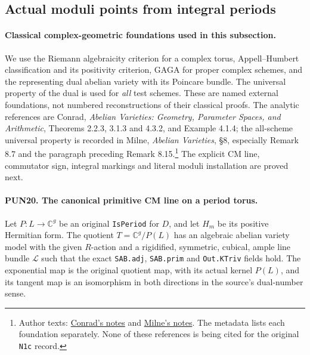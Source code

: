 \subsection{Actual moduli points from integral periods}

\paragraph{Classical complex-geometric foundations used in this subsection.}
We use the Riemann algebraicity criterion for a complex torus,
Appell--Humbert classification and its positivity criterion,
GAGA for proper complex schemes, and the representing dual abelian variety with its
Poincare bundle.  The universal property of the dual is used for
\emph{all} test schemes.  These are named external foundations,
not numbered reconstructions of their classical proofs.
The analytic references are Conrad, \emph{Abelian Varieties:
Geometry, Parameter Spaces, and Arithmetic}, Theorems 2.2.3,
3.1.3 and 4.3.2, and Example 4.1.4; the all-scheme universal
property is recorded in Milne, \emph{Abelian Varieties},
\S8, especially Remark 8.7 and the paragraph preceding
Remark 8.15.\footnote{Author texts:
\href{https://math.stanford.edu/~conrad/papers/cmchina.pdf}{Conrad's notes}
and \href{https://www.jmilne.org/math/CourseNotes/AV.pdf}{Milne's notes}.
The metadata lists each foundation separately.  None of these
references is being cited for the original \texttt{N1c} record.}
The explicit CM line, commutator sign, integral markings and
literal moduli installation are proved next.

\paragraph{PUN20. The canonical primitive CM line on a period torus.}
\label{claim:PUN20}
Let \(P:L\to\mathbb C^g\) be an original \texttt{IsPeriod}
for \(D\), and let \(H_m\) be its positive Hermitian form.
The quotient \(T=\mathbb C^g/P(L)\) has an algebraic abelian
variety model with the given \(R\)-action and a rigidified,
symmetric, cubical, ample line bundle \(\mathcal L\) such that
the exact \texttt{SAB.adj}, \texttt{SAB.prim} and
\texttt{Out.KTriv} fields hold.  The exponential map is the
original quotient map, with its actual kernel \(P(L)\), and
its tangent map is an isomorphism in both directions in the
source's dual-number sense.

